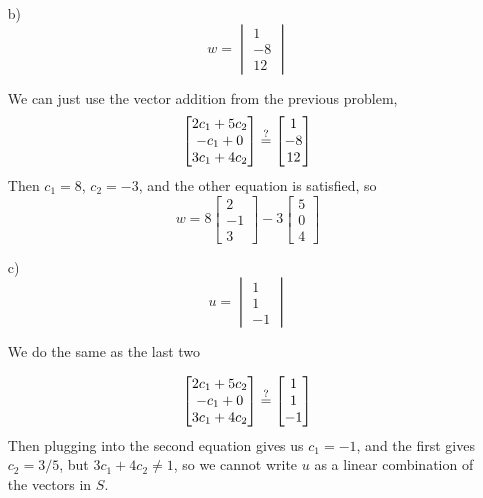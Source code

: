 \documentclass[reqno]{amsart}
\theoremstyle{definition}
\begin{document}
\begin{enumerate}
\begin{enumerate}
\item[b)  ]  
%
\begin{equation*}
w = \begin{vmatrix}
1\\
-8\\
12
\end{vmatrix}
\end{equation*}

We can just use the vector addition from the previous problem,
%
\begin{equation*}
\begin{bmatrix}
2c_1 + 5c_2\\
-c_1 + 0\\
3c_1 + 4c_2
\end{bmatrix} \stackrel{?}{=} \begin{bmatrix}
1\\
-8\\
12
\end{bmatrix}
\end{equation*}
%
Then $c_1 = 8$, $c_2 = -3$, and the other equation is satisfied, so
%
\begin{equation*}
w = 8\begin{bmatrix}
2\\
-1\\
3
\end{bmatrix} - 3\begin{bmatrix}
5\\
0\\
4
\end{bmatrix}
\end{equation*}

\item[c)  ]  
%
\begin{equation*}
u = \begin{vmatrix}
1\\
1\\
-1
\end{vmatrix}
\end{equation*}

We do the same as the last two

\begin{equation*}
\begin{bmatrix}
2c_1 + 5c_2\\
-c_1 + 0\\
3c_1 + 4c_2
\end{bmatrix} \stackrel{?}{=} \begin{bmatrix}
1\\
1\\
-1
\end{bmatrix}
\end{equation*}
%
Then plugging into the second equation gives us $c_1 = -1$, and the first gives $c_2 = 3/5$, but
$3c_1 + 4c_2 \neq 1$, so we cannot write $u$ as a linear combination of the vectors in $S$.


\end{enumerate}
\end{enumerate}
\end{document}
